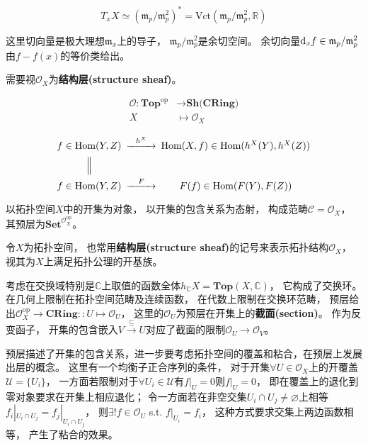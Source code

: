\documentclass[10pt, openany]{book}
\begin{document}
$$
T_x X \simeq \left( \mathfrak m_p / \mathfrak m_p^2 \right)^* = \text{Vct}(\mathfrak m_p / \mathfrak m_p^2,\mathbb R)
$$

这里切向量是极大理想$\mathfrak m_x$上的导子，
$\mathfrak m_p / \mathfrak m_p^2$是余切空间。
余切向量$\text d_x f \in \mathfrak m_p / \mathfrak m_p^2$由$f - f(x)$的等价类给出。


需要视$\mathcal O_X$为\textbf{结构层(structure sheaf)}。


$$
\begin{aligned}
\mathcal O: \textbf{Top}^\text{op} &\to \textbf{Sh(CRing)} \\
X &\mapsto \mathcal O_X
\end{aligned}
$$


$$
\begin{CD}    f \in \text{Hom}(Y,Z) @>h^X>> \text{Hom}(X,f) \in  \text{Hom}(h^X(Y),h^X(Z)) \\    @| @. \\   f \in \text{Hom}(Y,Z) @>F>> F(f) \in  \text{Hom}(F(Y),F(Z)) \\    \end{CD} \\
$$

以拓扑空间$X$中的开集为对象，
以开集的包含关系为态射，
构成范畴$\mathcal C = \mathcal O_X$，
其预层为$\textbf{Set}^{\mathcal O_X^\text{op}}$。

令$X$为拓扑空间，
也常用\textbf{结构层(structure sheaf)}的记号来表示拓扑结构$\mathcal O_X$，
视其为$X$上满足拓扑公理的开基族。

考虑在交换域特别是$\mathbb C$上取值的函数全体$h_\mathbb C X = \textbf{Top}(X,\mathbb C)$，
它构成了交换环。
在几何上限制在拓扑空间范畴及连续函数，
在代数上限制在交换环范畴，
预层给出$\mathcal O_X^\text{op} \to \textbf{CRing} :: U \mapsto \mathcal O_U$，
这里的$\mathcal O_U$为预层在开集上的\textbf{截面(section)}。
作为反变函子，
开集的包含嵌入$V \stackrel{\subseteq}{\longrightarrow} U$对应了截面的限制$\mathcal O_U \to \mathcal O_V$。

预层描述了开集的包含关系，进一步要考虑拓扑空间的覆盖和粘合，在预层上发展出层的概念。
这里有一个均衡子正合序列的条件，
对于开集$\forall U\in \mathcal O_X$上的开覆盖$\mathcal U = \{U_i\}$，
一方面若限制对于$\forall U_i \in \mathcal U$有$f|_U = 0$则$f|_U=0$，
即在覆盖上的退化到零对象要求在开集上相应退化；
令一方面若在非空交集$U_i \cap U_j \neq \varnothing$上相等$f_i|_{U_i \cap U_j} = f_j|_{U_i \cap U_j}$，
则$\exists ! f\in \mathcal O_U$ s.t. $f|_{U_i} = f_i$，
这种方式要求交集上两边函数相等，
产生了粘合的效果。
\end{document}
